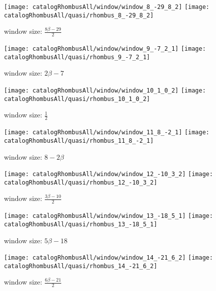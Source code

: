 \documentclass[text.tex]{subfiles}
\begin{document}
\begin{landscape}
\begin{figure}[h!]
\centering
\texttt{[image: catalogRhombusAll/window/window\_8\_-29\_8\_2]}
\texttt{[image: catalogRhombusAll/quasi/rhombus\_8\_-29\_8\_2]}
\caption*{window size: $\frac{8\beta-29}{2}$}
\end{figure}

\begin{figure}[h!]
\centering
\texttt{[image: catalogRhombusAll/window/window\_9\_-7\_2\_1]}
\texttt{[image: catalogRhombusAll/quasi/rhombus\_9\_-7\_2\_1]}
\caption*{window size: $2\beta-7$}
\end{figure}

\begin{figure}[h!]
\centering
\texttt{[image: catalogRhombusAll/window/window\_10\_1\_0\_2]}
\texttt{[image: catalogRhombusAll/quasi/rhombus\_10\_1\_0\_2]}
\caption*{window size: $\frac{1}{2}$}
\end{figure}

\thispagestyle{empty}
\begin{figure}[h!]
\centering
\texttt{[image: catalogRhombusAll/window/window\_11\_8\_-2\_1]}
\texttt{[image: catalogRhombusAll/quasi/rhombus\_11\_8\_-2\_1]}
\caption*{window size: $8-2\beta$}
\end{figure}

\begin{figure}[h!]
\centering
\texttt{[image: catalogRhombusAll/window/window\_12\_-10\_3\_2]}
\texttt{[image: catalogRhombusAll/quasi/rhombus\_12\_-10\_3\_2]}
\caption*{window size: $\frac{3\beta-10}{2}$}
\end{figure}

\begin{figure}[h!]
\centering
\texttt{[image: catalogRhombusAll/window/window\_13\_-18\_5\_1]}
\texttt{[image: catalogRhombusAll/quasi/rhombus\_13\_-18\_5\_1]}
\caption*{window size: $5\beta-18$}
\end{figure}

\begin{figure}[h!]
\centering
\texttt{[image: catalogRhombusAll/window/window\_14\_-21\_6\_2]}
\texttt{[image: catalogRhombusAll/quasi/rhombus\_14\_-21\_6\_2]}
\caption*{window size: $\frac{6\beta-21}{2}$}
\end{figure}


\end{landscape}
\end{document}
